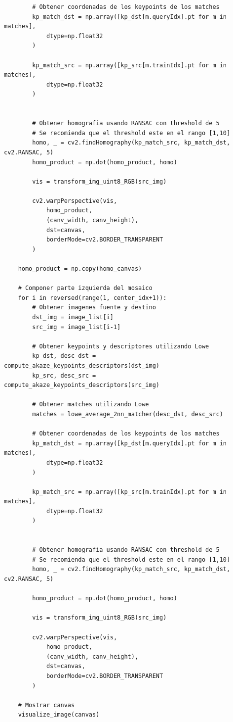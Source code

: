 \documentclass[11pt,a4paper]{article}
\begin{document}
\begin{lstlisting}
        # Obtener coordenadas de los keypoints de los matches
        kp_match_dst = np.array([kp_dst[m.queryIdx].pt for m in matches],
            dtype=np.float32
        )
        
        kp_match_src = np.array([kp_src[m.trainIdx].pt for m in matches],
            dtype=np.float32
        )


        # Obtener homografia usando RANSAC con threshold de 5
        # Se recomienda que el threshold este en el rango [1,10]
        homo, _ = cv2.findHomography(kp_match_src, kp_match_dst, cv2.RANSAC, 5)
        homo_product = np.dot(homo_product, homo)

        vis = transform_img_uint8_RGB(src_img)

        cv2.warpPerspective(vis,
            homo_product,
            (canv_width, canv_height),
            dst=canvas,
            borderMode=cv2.BORDER_TRANSPARENT
        )
    
    homo_product = np.copy(homo_canvas)
    
    # Componer parte izquierda del mosaico
    for i in reversed(range(1, center_idx+1)):
        # Obtener imagenes fuente y destino
        dst_img = image_list[i]
        src_img = image_list[i-1]
 
        # Obtener keypoints y descriptores utilizando Lowe
        kp_dst, desc_dst = compute_akaze_keypoints_descriptors(dst_img)
        kp_src, desc_src = compute_akaze_keypoints_descriptors(src_img)

        # Obtener matches utilizando Lowe
        matches = lowe_average_2nn_matcher(desc_dst, desc_src)

        # Obtener coordenadas de los keypoints de los matches
        kp_match_dst = np.array([kp_dst[m.queryIdx].pt for m in matches],
            dtype=np.float32
        )
        
        kp_match_src = np.array([kp_src[m.trainIdx].pt for m in matches],
            dtype=np.float32
        )


        # Obtener homografia usando RANSAC con threshold de 5
        # Se recomienda que el threshold este en el rango [1,10]
        homo, _ = cv2.findHomography(kp_match_src, kp_match_dst, cv2.RANSAC, 5)

        homo_product = np.dot(homo_product, homo)

        vis = transform_img_uint8_RGB(src_img)

        cv2.warpPerspective(vis,
            homo_product,
            (canv_width, canv_height),
            dst=canvas,
            borderMode=cv2.BORDER_TRANSPARENT
        )

    # Mostrar canvas
    visualize_image(canvas)
\end{lstlisting}
\end{document}
